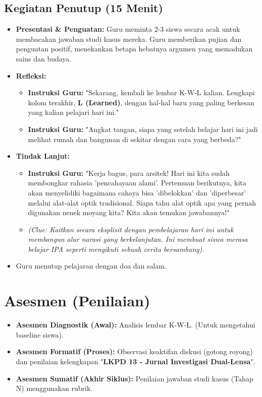 \documentclass[12pt,a4paper]{article}
\begin{document}
\subsection{Kegiatan Penutup (15 Menit)}
\begin{itemize}
\item \textbf{Presentasi \& Penguatan:} Guru meminta 2-3 siswa secara acak untuk membacakan jawaban studi kasus mereka. Guru memberikan pujian dan penguatan positif, menekankan betapa hebatnya argumen yang memadukan sains dan budaya.
\item \textbf{Refleksi:}
    \begin{itemize}
    \item \textbf{Instruksi Guru:} "Sekarang, kembali ke lembar K-W-L kalian. Lengkapi kolom terakhir, \textbf{L (Learned)}, dengan hal-hal baru yang paling berkesan yang kalian pelajari hari ini."
    \item \textbf{Instruksi Guru:} "Angkat tangan, siapa yang setelah belajar hari ini jadi melihat rumah dan bangunan di sekitar dengan cara yang berbeda?"
    \end{itemize}
\item \textbf{Tindak Lanjut:}
    \begin{itemize}
    \item \textbf{Instruksi Guru:} "Kerja bagus, para arsitek! Hari ini kita sudah membongkar rahasia 'pencahayaan alami'. Pertemuan berikutnya, kita akan menyelidiki bagaimana cahaya bisa 'dibelokkan' dan 'diperbesar' melalui alat-alat optik tradisional. Siapa tahu alat optik apa yang pernah digunakan nenek moyang kita? Kita akan temukan jawabannya!"
    \item \textit{(Clue: Kaitkan secara eksplisit dengan pembelajaran hari ini untuk membangun alur narasi yang berkelanjutan. Ini membuat siswa merasa belajar IPA seperti mengikuti sebuah cerita bersambung).}
    \end{itemize}
\item Guru menutup pelajaran dengan doa dan salam.
\end{itemize}

\section{Asesmen (Penilaian)}

\begin{itemize}
\item \textbf{Asesmen Diagnostik (Awal):} Analisis lembar K-W-L. (Untuk mengetahui baseline siswa).
\item \textbf{Asesmen Formatif (Proses):} Observasi keaktifan diskusi (gotong royong) dan penilaian kelengkapan "\textbf{LKPD 13 - Jurnal Investigasi Dual-Lensa}".
\item \textbf{Asesmen Sumatif (Akhir Siklus):} Penilaian jawaban studi kasus (Tahap N) menggunakan rubrik.
\end{itemize}
\end{document}
